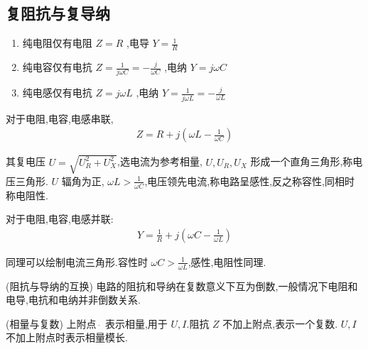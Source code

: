 
\usepackage{../../lectures_preamble}


    \subsection{复阻抗与复导纳}
        \begin{enumerate}
            \item 纯电阻仅有电阻 $Z=R$ ,电导 $Y=\frac{1}{R}$
            \item 纯电容仅有电抗 $Z=\frac{1}{j\omega C}=-\frac{j}{\omega C}$ ,电纳 $Y=j\omega C$
             \item 纯电感仅有电抗 $Z=j\omega L$ ,电纳 $Y=\frac{1}{j\omega L}=-\frac{j}{\omega L}$
        \end{enumerate}

        对于电阻,电容,电感串联, 
        \begin{align}
            Z=R+j(\omega L-\frac{1}{\omega C})\nonumber
        \end{align}

        其复电压 $U=\sqrt{U_{R}^2+U_{X}^2}$,选电流为参考相量, $U,U_{R},U_{X}$ 形成一个直角三角形,称电压三角形. $U$ 辐角为正, $\omega L > \frac{1}{\omega C}$,电压领先电流,称电路呈感性,反之称容性,同相时称电阻性.

        对于电阻,电容,电感并联: 
        \begin{align}
            Y=\frac{1}{R}+j(\omega C -\frac{1}{\omega L})\nonumber
        \end{align}

        同理可以绘制电流三角形.容性时 $\omega C> \frac{1}{\omega L}$,感性,电阻性同理.
        \begin{remark}
            (阻抗与导纳的互换) 电路的阻抗和导纳在复数意义下互为倒数,一般情况下电阻和电导,电抗和电纳并非倒数关系.
        \end{remark}
        \begin{remark}
            (相量与复数) 上附点 $\dot\ $ 表示相量,用于 $U,I$.阻抗 $Z$ 不加上附点,表示一个复数. $U,I$ 不加上附点时表示相量模长.
        \end{remark}
        
